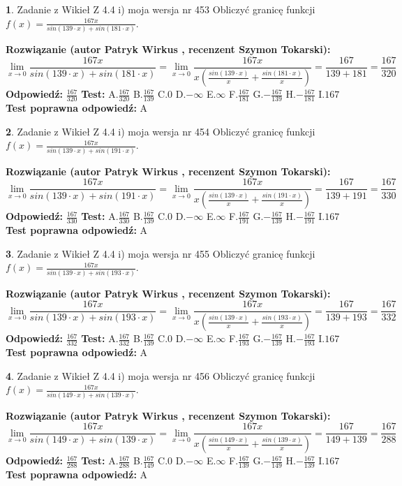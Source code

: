 \documentclass[12pt, a4paper]{article}
\theoremstyle{definition} %
\newtheorem{zad}{}
\newcommand{\zadStart}[1]{\begin{zad}#1\newline}
\newcommand{\zadStop}{\end{zad}}
\newcommand{\rozwStart}[2]{\noindent \textbf{Rozwiązanie (autor #1 , recenzent #2): }\newline}
\newcommand{\rozwStop}{\newline}
\newcommand{\odpStart}{\noindent \textbf{Odpowiedź:}\newline}
\newcommand{\odpStop}{\newline}
\newcommand{\testStart}{\noindent \textbf{Test:}\newline}
\newcommand{\testStop}{\newline}
\newcommand{\kluczStart}{\noindent \textbf{Test poprawna odpowiedź:}\newline}
\newcommand{\kluczStop}{\newline}
\begin{document}
\zadStart{Zadanie z Wikieł Z 4.4 i) moja wersja nr 453}
Obliczyć granicę funkcji $f(x)=\frac{167x}{sin(139\cdot x) +sin(181\cdot x)}$.
\zadStop
\rozwStart{Patryk Wirkus}{Szymon Tokarski}
$$\lim\limits_{x\to 0}\frac{167x}{sin(139\cdot x) +sin(181\cdot x)}=\lim\limits_{x\to 0}\frac{167x}{x(\frac{sin(139\cdot x)}{x}+\frac{sin(181\cdot x)}{x})}=\frac{167}{139+181} = \frac{167}{320}$$
\rozwStop
\odpStart
$\frac{167}{320}$
\odpStop
\testStart
A.$\frac{167}{320}$
B.$\frac{167}{139}$
C.$0$
D.$-\infty$
E.$\infty$
F.$\frac{167}{181}$
G.$-\frac{167}{139}$
H.$-\frac{167}{181}$
I.$167$
\testStop
\kluczStart
A
\kluczStop



\zadStart{Zadanie z Wikieł Z 4.4 i) moja wersja nr 454}
Obliczyć granicę funkcji $f(x)=\frac{167x}{sin(139\cdot x) +sin(191\cdot x)}$.
\zadStop
\rozwStart{Patryk Wirkus}{Szymon Tokarski}
$$\lim\limits_{x\to 0}\frac{167x}{sin(139\cdot x) +sin(191\cdot x)}=\lim\limits_{x\to 0}\frac{167x}{x(\frac{sin(139\cdot x)}{x}+\frac{sin(191\cdot x)}{x})}=\frac{167}{139+191} = \frac{167}{330}$$
\rozwStop
\odpStart
$\frac{167}{330}$
\odpStop
\testStart
A.$\frac{167}{330}$
B.$\frac{167}{139}$
C.$0$
D.$-\infty$
E.$\infty$
F.$\frac{167}{191}$
G.$-\frac{167}{139}$
H.$-\frac{167}{191}$
I.$167$
\testStop
\kluczStart
A
\kluczStop



\zadStart{Zadanie z Wikieł Z 4.4 i) moja wersja nr 455}
Obliczyć granicę funkcji $f(x)=\frac{167x}{sin(139\cdot x) +sin(193\cdot x)}$.
\zadStop
\rozwStart{Patryk Wirkus}{Szymon Tokarski}
$$\lim\limits_{x\to 0}\frac{167x}{sin(139\cdot x) +sin(193\cdot x)}=\lim\limits_{x\to 0}\frac{167x}{x(\frac{sin(139\cdot x)}{x}+\frac{sin(193\cdot x)}{x})}=\frac{167}{139+193} = \frac{167}{332}$$
\rozwStop
\odpStart
$\frac{167}{332}$
\odpStop
\testStart
A.$\frac{167}{332}$
B.$\frac{167}{139}$
C.$0$
D.$-\infty$
E.$\infty$
F.$\frac{167}{193}$
G.$-\frac{167}{139}$
H.$-\frac{167}{193}$
I.$167$
\testStop
\kluczStart
A
\kluczStop



\zadStart{Zadanie z Wikieł Z 4.4 i) moja wersja nr 456}
Obliczyć granicę funkcji $f(x)=\frac{167x}{sin(149\cdot x) +sin(139\cdot x)}$.
\zadStop
\rozwStart{Patryk Wirkus}{Szymon Tokarski}
$$\lim\limits_{x\to 0}\frac{167x}{sin(149\cdot x) +sin(139\cdot x)}=\lim\limits_{x\to 0}\frac{167x}{x(\frac{sin(149\cdot x)}{x}+\frac{sin(139\cdot x)}{x})}=\frac{167}{149+139} = \frac{167}{288}$$
\rozwStop
\odpStart
$\frac{167}{288}$
\odpStop
\testStart
A.$\frac{167}{288}$
B.$\frac{167}{149}$
C.$0$
D.$-\infty$
E.$\infty$
F.$\frac{167}{139}$
G.$-\frac{167}{149}$
H.$-\frac{167}{139}$
I.$167$
\testStop
\kluczStart
A
\kluczStop
\end{document}
